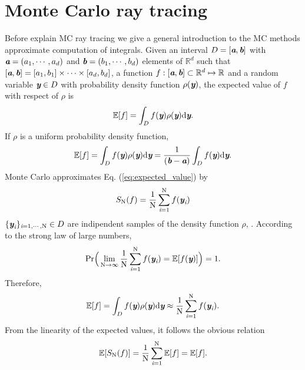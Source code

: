 \section{Monte Carlo ray tracing}
Before explain MC ray tracing we give a general introduction to the MC methods approximate computation of integrals. Given an interval $D = [\textit{\textbf{a}}, \textit{\textbf{b}}]$ with $\textit{\textbf{a}} = (a_1, \cdots, a_d)$ and $\textit{\textbf{b}} = (b_1, \cdots, b_d)$ elements of $\mathbb{R}^d$ such that
$[\textit{\textbf{a}}, \textit{\textbf{b}}]  = [a_1, b_1] \times \cdots \times [a_d, b_d]$, a function $f:[\textit{\textbf{a}},\textit{\textbf{b}}]\subset \mathbb{R}^d \mapsto \mathbb{R}$ and a random variable 
$\textit{\textbf{y}}\in D$ with probability density function $\rho(\textit{\textbf{y}})$, the expected value of $f$ with respect of $\rho$ is
\begin{equation}
\mathbb{E}[f] =\int_{D}f(\textit{\textbf{y}})\rho(\textit{\textbf{y}}) \textrm{d}\textit{\textbf{y}}.
\end{equation}
If $\rho$ is a uniform probability density function,
\begin{equation}\label{eq:expected_value}
\mathbb{E}[f] = \int_{D}f(\textit{\textbf{y}})\rho(\textit{\textbf{y}}) \textrm{d}\textit{\textbf{y}} =\frac{1}{(\textit{\textbf{b}}-\textit{\textbf{a}})} \int_{D}f(\textit{\textbf{y}}) \textrm{d}\textit{\textbf{y}}.
\end{equation}
Monte Carlo approximates Eq. (\ref{eq:expected_value}) by
\begin{equation}
S_{\textrm{N}}(f) = \frac{1}{\textrm{N}} \sum_{\textit{i}=1}^{\textrm{N}} f(\textit{\textbf{y}}_{\textit{i}})
\end{equation}
 $\{\textit{\textbf{y}}_{\textit{i}}\}_{\textit{i} = 1, \cdots, \textrm{N}}\in D$ are indipendent samples of the density function  $\rho$, \cite{owen2003quasi}.
According to the strong law of large numbers,
\begin{equation}
\textrm{Pr}\Big(\lim_{\textrm{N}\rightarrow\infty}\frac{1}{\textrm{N}}\sum_{\textit{i}=1}^{\textrm{N}} f(\textit{\textbf{y}}_{\textit{i}}) = \mathbb{E}[f(\textit{\textbf{y}})] \Big) = 1.
\end{equation}
Therefore,
\begin{equation}
\mathbb{E}[f] = \int_{D}f(\textit{\textbf{y}})\rho(\textit{\textbf{y}}) \textrm{d}\textit{\textbf{y}}  \approx \frac{1}{\textrm{N}} \sum_{\textit{i}=1}^{\textrm{N}} f(\textit{\textbf{y}}_{\textit{i}}).
\end{equation}
From the linearity of the expected values, it follows the obvious relation
\begin{equation}\label{eq:linearity}
\mathbb{E}[S_{\textrm{N}}(f)] = \frac{1}{\textrm{N}}\sum_{\textit{i}=1}^{\textrm{N}}\mathbb{E}[f] = \mathbb{E}[f].
\end{equation}
